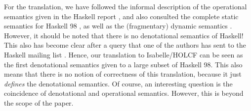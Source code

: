 \documentclass{llncs}
\begin{document}
For the translation, we have followed the informal description of the
operational semantics given in the Haskell report \cite{HaskellRep},
and also consulted the complete static semantics for Haskell 98
\cite{journals/jfp/Faxen02}, as well as the (fragmentary) dynamic
semantics \cite{oai:CiteSeerPSU:71374}.  However, it should be noted
that there is no denotational semantics of Haskell! This also has
become clear after a query that one of the authors has sent to the
Haskell mailing list \cite{HaskellMail05}.  Hence, our translation to
Isabelle/HOLCF can be seen as the first denotational semantics given
to a large subset of Haskell 98.  This also means that there is no
notion of correctness of this translation, because it just
\emph{defines} the denotational semantics.  Of course, an interesting
question is the coincidence of denotational and operational semantics.
However, this is beyond the scope of the paper.






\end{document}
